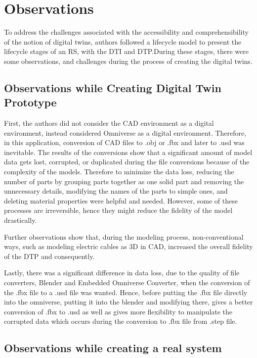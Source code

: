 \documentclass[conference]{IEEEtran}
\begin{document}
    \section{Observations} 
    To address the challenges associated with the accessibility and comprehensibility of the notion of digital twins, authors followed a lifecycle model to present the lifecycle stages of an RS, with the DTI and DTP.During these stages, there were some observations, and challenges during the process of creating the digital twins. 
    
    \subsection{Observations while Creating Digital Twin Prototype}

    First, the authors did not consider the CAD environment as a digital environment, instead considered Omniverse as a digital environment. Therefore, in this application, conversion of CAD files to .obj or .fbx and later to .usd was inevitable. The results of the conversions show that a significant amount of model data gets lost, corrupted, or duplicated during the file conversions because of the complexity of the models. Therefore to minimize the data loss, reducing the number of parts by grouping parts together as one solid part and removing the unnecessary details, modifying the names of the parts to simple ones, and deleting material properties were helpful and needed. However, some of these processes are irreversible, hence they might reduce the fidelity of the model drastically.

    Further observations show that, during the modeling process, non-conventional ways, such as modeling electric cables as 3D in CAD, increased the overall fidelity of the DTP and consequently.

    Lastly, there was a significant difference in data loss, due to the quality of file converters, Blender and Embedded Omniverse Converter, when the conversion of the .fbx file to a .usd file was wanted. Hence, before putting the .fbx file directly into the omniverse, putting it into the blender and modifying there,  gives a better conversion of .fbx to .usd as well as gives more flexibility to manipulate the corrupted data which occurs during the conversion to .fbx file from .step file.

    \subsection{Observations while creating a real system}
\end{document}
